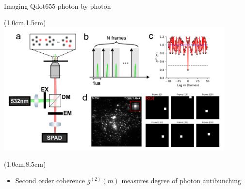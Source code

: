 \documentclass{beamer}					%
\begin{document}


\begin{frame}{Imaging Qdot655 photon by photon}
\begin{textblock*}{12cm}(1.0cm,1.5cm)
\includegraphics[width=12cm]{../../spad/spad/media/Figure-0.png}
\end{textblock*}
\begin{textblock*}{13cm}(1.0cm,8.5cm)
\begin{itemize}
\item Second order coherence $g^{(2)}(m)$ measures degree of photon antibunching
\end{itemize}
\end{textblock*}

\end{frame}
\end{document}
